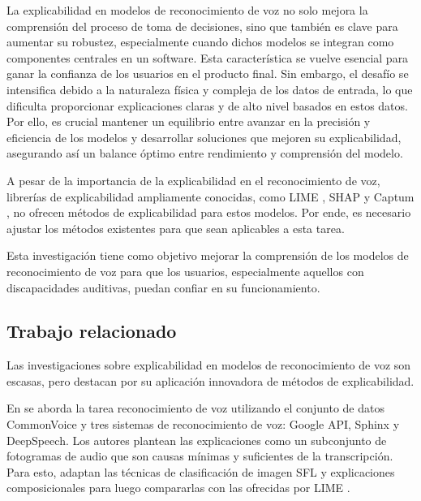\documentclass[conference]{IEEEtran}
\begin{document}
La explicabilidad en modelos de reconocimiento de voz no solo mejora la comprensión del proceso de toma de decisiones, sino que también es clave para aumentar su robustez, especialmente cuando dichos modelos se integran como componentes centrales en un software. Esta característica se vuelve esencial para ganar la confianza de los usuarios en el producto final. Sin embargo, el desafío se intensifica debido a la naturaleza física y compleja de los datos de entrada, lo que dificulta proporcionar explicaciones claras y de alto nivel basados en estos datos. Por ello, es crucial mantener un equilibrio entre avanzar en la precisión y eficiencia de los modelos y desarrollar soluciones que mejoren su explicabilidad, asegurando así un balance óptimo entre rendimiento y comprensión del modelo.

A pesar de la importancia de la explicabilidad en el reconocimiento de voz, librerías de explicabilidad ampliamente conocidas, como LIME \cite{ribeiro2016why}, SHAP \cite{lundberg2017unified} y Captum \cite{DBLP:journals/corr/abs-2009-07896}, no ofrecen métodos de explicabilidad para estos modelos. Por ende, es necesario ajustar los métodos existentes para que sean aplicables a esta tarea.

Esta investigación tiene como objetivo mejorar la comprensión de los modelos de reconocimiento de voz para que los usuarios, especialmente aquellos con discapacidades auditivas, puedan confiar en su funcionamiento.

\subsection{Trabajo relacionado}

Las investigaciones sobre explicabilidad en modelos de reconocimiento de voz son escasas, pero destacan por su aplicación innovadora de métodos de explicabilidad.

En \cite{10094635} se aborda la tarea reconocimiento de voz utilizando el conjunto de datos CommonVoice \cite{commonvoice:2020} y tres sistemas de reconocimiento de voz: Google API, Sphinx y DeepSpeech. Los autores plantean las explicaciones como un subconjunto de fotogramas de audio que son causas mínimas y suficientes de la transcripción. Para esto, adaptan las técnicas de clasificación de imagen SFL \cite{sun2020explaining} y explicaciones composicionales \cite{unknown} para luego compararlas con las ofrecidas por LIME \cite{ribeiro2016why}.
\end{document}
